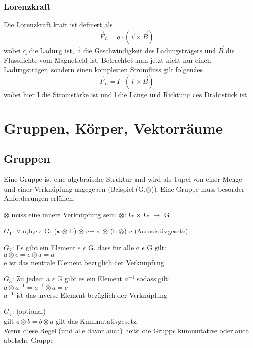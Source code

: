 \documentclass[a4paper,10pt]{scrartcl}
\begin{document}
            \subsubsection{Lorenzkraft}
            Die Lorenzkraft kraft ist definert als
            \[\vec{F}_L = q \cdot (\vec{v} \times \vec{B})\] 
            wobei q die Ladung ist, $\vec{v}$ die Geschwindigkeit des Ladungsträgers und
            $\vec{B}$ die Flussdichte vom Magnetfeld ist. Betrachtet man jetzt nicht nur einen Ladungsträger, sondern einen kompletten Stromfluss gilt folgendes 
            \[\vec{F}_L = I  \cdot (\vec{l} \times \vec{B})\]
            wobei hier I die Stromstärke ist und l die Länge und Richtung des Drahtstück ist.
    \newpage
    \section{Gruppen, Körper, Vektorräume}
        \subsection{Gruppen}
            Eine Gruppe ist eine algebraische Struktur und wird als Tupel von einer Menge und einer Verknüpfung angegeben (Beispiel (G,$\otimes$)). Eine Gruppe muss 
            besonder Anforderungen erfüllen: 
            \begin{description}
                \item $\otimes$ muss eine innere Verknüpfung sein: $\otimes$: G $\times$ G $\rightarrow$ G 
                \item $G_1$: $\forall$ a,b,c $\epsilon$ G: (a $\otimes$ b) $\otimes$ c= a $\otimes$ (b $\otimes$) c (Assoziativgesetz)
                \item $G_2$: Es gibt ein Element $e$ $\epsilon$ G, dass für alle $a$ $\epsilon$ G gilt:\\ $a \otimes e = e \otimes a = a$ \\ e ist das neutrale Element bezüglich der Verknüpfung
                \item $G_3$: Zu jedem a $\epsilon$ G gibt es ein Element $a^{-1}$ sodass gilt: \\ $a \otimes a^{-1} = a^{-1} \otimes a = e$ \\ $a^{-1}$ ist das inverse Element bezüglich der Verknüpfung
                \item $G_4$: (optional) \\ gilt $a \otimes b = b \otimes a$ gilt das Kummutativgesetz. \\Wenn diese Regel (und alle davor auch) heißt die Gruppe kummutative oder auch abelsche Gruppe
            \end{description}
\end{document}
